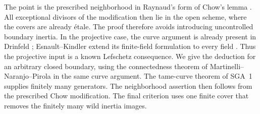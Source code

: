 The point is the prescribed neighborhood in Raynaud's form of Chow's
lemma \cite[Chapter 4, \S4, Proposition 5, p.~30]{Raynaud}. All
exceptional divisors of the modification then lie in the open scheme,
where the covers are already \'etale. The proof therefore avoids
introducing uncontrolled boundary inertia. In the projective case,
the curve argument is already present in Drinfeld
\cite[Lemma C.2, p.~19]{Drinfeld}; Esnault--Kindler extend its
finite-field formulation to every field
\cite[Proposition 6.2, pp.~8--9]{EsnaultKindler}. Thus the projective
input is a known Lefschetz consequence. We give the deduction for an
arbitrary closed boundary, using the connectedness theorem of
Martinelli--Naranjo--Pirola \cite[Theorem 1.1, p.~31]{MNP} in the same
curve argument. The tame-curve theorem of SGA~1 supplies finitely many
generators. The neighborhood assertion then follows from the prescribed
Chow modification. The final criterion uses one finite cover that
removes the finitely many wild inertia images.
